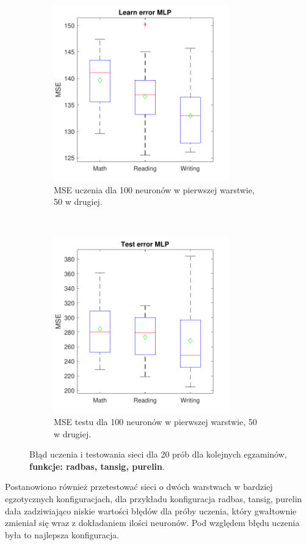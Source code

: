 \documentclass[12pt]{article}
\begin{document}
\begin{figure}[H]
\begin{subfigure}[t]{0.48\textwidth} 
\centering
\includegraphics[height=3in]{radbas_tansig_purelin_50_learnBoxplot.pdf}
\caption{MSE uczenia dla  100 neuronów w pierwszej warstwie, 50 w drugiej.}
\end{subfigure}
~~
\begin{subfigure}[t]{0.48\textwidth} 
\centering
\includegraphics[height=3in]{radbas_tansig_purelin_50_testBoxplot.pdf}
\caption{MSE testu dla 100 neuronów w pierwszej warstwie, 50 w drugiej.}
\end{subfigure}

\caption{Błąd uczenia i testowania sieci dla 20 prób dla kolejnych egzaminów, \textbf{funkcje: radbas, tansig, purelin}.}
\end{figure}

Postanowiono również przetestować sieci o dwóch warstwach w bardziej egzotycznych konfiguracjach, dla przykładu konfiguracja radbas, tansig, purelin dała zadziwiająco niskie wartości błędów dla próby uczenia, który gwałtownie zmieniał się wraz z dokładaniem ilości neuronów. Pod względem błędu uczenia była to najlepsza konfiguracja.
\end{document}
